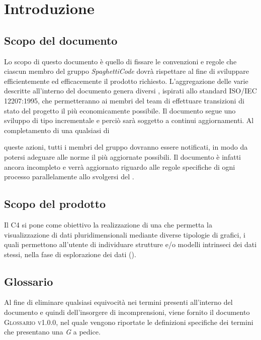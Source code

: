 \section{Introduzione}
\label{sec:introduzione}

\subsection{Scopo del documento}

Lo scopo di questo documento è quello di fissare le convenzioni e regole che ciascun membro del gruppo \emph{SpaghettiCode} dovrà 
rispettare al fine di sviluppare efficientemente ed efficacemente il prodotto richiesto. %
L'aggregazione delle varie  descritte all'interno del documento genera diversi , ispirati allo 
standard \textsc{ISO/IEC 12207:1995}, che permetteranno ai membri del team di effettuare transizioni di stato del progetto il più 
economicamente possibile. 
Il documento segue uno sviluppo di tipo incrementale e perciò sarà soggetto a continui aggiornamenti. Al completamento di una qualsiasi di 

queste azioni, tutti i membri del gruppo dovranno essere notificati, in modo da potersi adeguare alle norme il più aggiornate possibili. Il 
documento è infatti ancora incompleto e verrà aggiornato riguardo alle regole specifiche di ogni processo parallelamente allo svolgersi 
del .

\subsection{Scopo del prodotto}

Il  \textsc{C4} si pone come obiettivo la realizzazione di una  che 
permetta la visualizzazione di dati pluridimensionali mediante diverse tipologie di grafici, i quali permettono 
all'utente di individuare strutture e/o modelli intrinseci dei dati stessi, nella fase di esplorazione dei dati 
().

\subsection{Glossario}

Al fine di eliminare qualsiasi equivocità nei termini presenti all'interno del documento e quindi dell'insorgere di incomprensioni, viene 
fornito il documento \textsc{Glossario v1.0.0}, nel quale vengono riportate le definizioni specifiche dei termini che presentano una 
\emph{G} a pedice.

